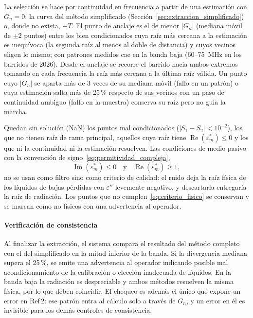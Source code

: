 La selección se hace por continuidad en frecuencia a partir de una estimación con
$G_n = 0$: la curva del método simplificado
(Sección~\ref{sec:extraccion_simplificado}) o, donde no exista, $-T$. El punto de
anclaje es el de menor $|G_n|$ (mediana móvil de $\pm 2$ puntos) entre los bien
condicionados cuya raíz más cercana a la estimación es inequívoca (la segunda
raíz al menos al doble de distancia) y cuyos vecinos eligen lo mismo; con
patrones medidos cae en la banda baja (60--75~MHz en los barridos de 2026). Desde
el anclaje se recorre el barrido hacia ambos extremos tomando en cada frecuencia
la raíz más cercana a la última raíz válida. Un punto cuyo $|G_n|$ se aparta más
de 3 veces de su mediana móvil (fallo en un patrón) o cuya estimación salta más
de 25\,\% respecto de sus vecinos con un paso de continuidad ambiguo (fallo en la
muestra) conserva su raíz pero no guía la marcha.

Quedan sin solución (NaN) los puntos mal condicionados
($|S_1 - S_2| < 10^{-2}$), los que no tienen raíz de rama principal, aquellos
cuya raíz tiene $\operatorname{Re}(\varepsilon_m^*) \leq 0$ y los que ni la
continuidad ni la estimación resuelven. Las condiciones de medio pasivo con la
convención de signo~\eqref{eq:permitividad_compleja},
\begin{equation}
    \operatorname{Im}(\varepsilon_m^*) \leq 0 \quad \text{y} \quad
    \operatorname{Re}(\varepsilon_m^*) \geq 1,
    \label{eq:criterio_fisico}
\end{equation}
no se usan como filtro sino como criterio de calidad: el ruido deja la raíz
física de los líquidos de bajas pérdidas con $\varepsilon''$ levemente negativo,
y descartarla entregaría la raíz de radiación. Los puntos que no
cumplen~\eqref{eq:criterio_fisico} se conservan y se marcan como no físicos con
una advertencia al operador.

\paragraph{Verificación de consistencia}

Al finalizar la extracción, el sistema compara el resultado del método completo
con el del simplificado en la mitad inferior de la banda. Si la divergencia
mediana supera el 25\,\%, se emite una advertencia al operador indicando posible
mal acondicionamiento de la calibración o elección inadecuada de líquidos. En la
banda baja la radiación es despreciable y ambos métodos resuelven la misma
física, por lo que deben coincidir. El chequeo es además el único que expone un
error en Ref\,2: ese patrón entra al cálculo solo a través de $G_n$, y un error
en él es invisible para los demás controles de consistencia.

